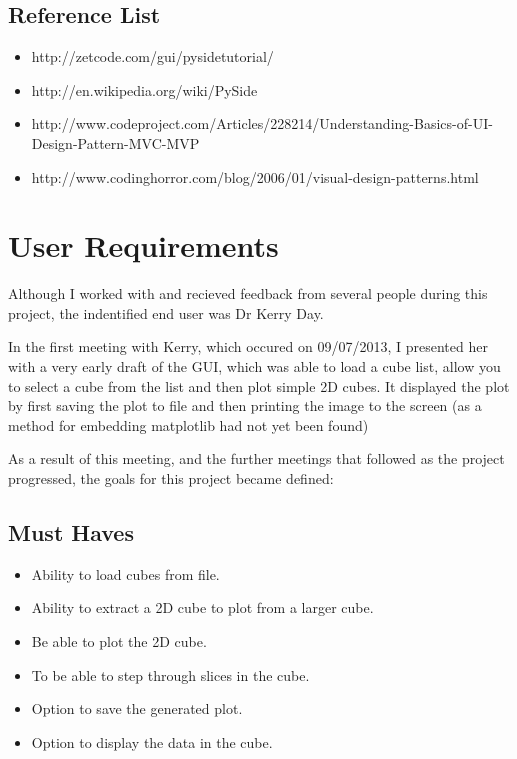 \documentclass[whitecover]{MO_report}
\begin{document}
\section{Reference List}

\begin{itemize}

\item
http://zetcode.com/gui/pysidetutorial/

\item
http://en.wikipedia.org/wiki/PySide

\item
http://www.codeproject.com/Articles/228214/Understanding-Basics-of-UI-Design-Pattern-MVC-MVP

\item
http://www.codinghorror.com/blog/2006/01/visual-design-patterns.html

\end{itemize}

\pagebreak

\chapter{User Requirements}

Although I worked with and recieved feedback from several people during this
project, the indentified end user was Dr Kerry Day.

In the first meeting with Kerry, which occured on 09/07/2013, I presented her
with a very early draft of the GUI, which was able to load a cube list, allow
you to select a cube from the list and then plot simple 2D cubes. It displayed
the plot by first saving the plot to file and then printing the image to the
screen (as a method for embedding matplotlib had not yet been found)

As a result of this meeting, and the further meetings that followed as the
project progressed, the goals for this project became defined:

\vspace{4mm}

\section{Must Haves}

\begin{itemize}

\item
Ability to load cubes from file.

\item
Ability to extract a 2D cube to plot from a larger cube.

\item
Be able to plot the 2D cube.

\item
To be able to step through slices in the cube.

\item
Option to save the generated plot.

\item
Option to display the data in the cube.

\end{itemize}
\end{document}
